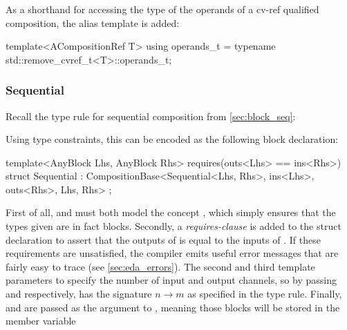 \subsubsection{}

As a shorthand for accessing the type of the operands of a cv-ref qualified composition, the
 alias template is added:

\begin{cppcodenl}
  template<ACompositionRef T>
  using operands_t = typename std::remove_cvref_t<T>::operands_t;
\end{cppcodenl}

\subsubsection{Sequential}

Recall the type rule for sequential composition from \autoref{sec:block_seq}:

\begin{prooftree}
\end{prooftree}

Using type constraints, this can be encoded as the following block declaration:

\begin{cppcodenl}
  template<AnyBlock Lhs, AnyBlock Rhs>
  requires(outs<Lhs> == ins<Rhs>)
  struct Sequential : CompositionBase<Sequential<Lhs, Rhs>, ins<Lhs>, outs<Rhs>, Lhs, Rhs> {};
\end{cppcodenl}

First of all,  and  must both model the concept , which simply
ensures that the types given are in fact blocks. Secondly, a \emph{requires-clause} is added to the struct
declaration to assert that the outputs of  is equal to the inputs of . If these requirements are unsatisfied,
the compiler emits useful error messages that are fairly easy to trace (see \autoref{sec:eda_errors}). The
second and third template parameters to  specify the number of input and output
channels, so by passing  and  respectively,
 has the signature $n \rightarrow m$ as specified in the type rule. Finally,  and
 are passed as the  argument to , meaning those blocks will be stored
in the  member variable

